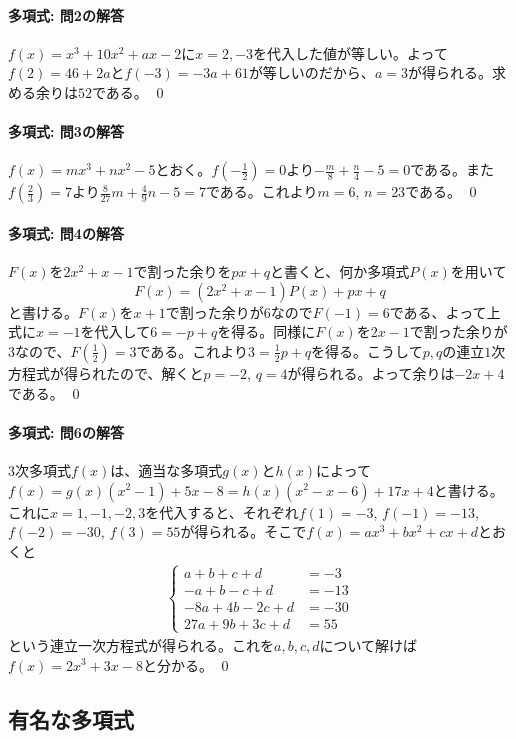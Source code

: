 \paragraph{多項式: 問2の解答}
$f(x)=x^3+10x^2+ax-2$に$x=2,-3$を代入した値が等しい。よって$f(2)=46+2a$と$f(-3)=-3a+61$が等しいのだから、$a=3$が得られる。求める余りは$52$である。 \qed

\paragraph{多項式: 問3の解答}
$f(x)=mx^3+nx^2-5$とおく。$f(-\frac{1}{2})=0$より$-\frac{m}{8}+\frac{n}{4}-5=0$である。また$f(\frac{2}{3})=7$より$\frac{8}{27}m+\frac{4}{9}n-5=7$である。これより$m=6$, $n=23$である。 \qed

\paragraph{多項式: 問4の解答} 	$F(x)$を$2x^2+x-1$で割った余りを$px+q$と書くと、何か多項式$P(x)$を用いて
\[
F(x) = (2x^2+x-1)P(x) + px + q
\]
と書ける。$F(x)$を$x+1$で割った余りが$6$なので$F(-1)=6$である、よって上式に$x=-1$を代入して$6=-p+q$を得る。同様に$F(x)$を$2x-1$で割った余りが$3$なので、$F(\frac{1}{2})=3$である。これより$3=\frac{1}{2}p+q$を得る。こうして$p,q$の連立$1$次方程式が得られたので、解くと$p=-2$, $q=4$が得られる。よって余りは$-2x+4$である。 \qed

\paragraph{多項式: 問6の解答}
$3$次多項式$f(x)$は、適当な多項式$g(x)$と$h(x)$によって$f(x)=g(x)(x^2-1)+5x-8=h(x)(x^2-x-6)+17x+4$と書ける。これに$x=1,-1,-2,3$を代入すると、それぞれ$f(1)=-3$, $f(-1)=-13$, $f(-2)=-30$, $f(3)=55$が得られる。そこで$f(x)=ax^3+bx^2+cx+d$とおくと
\begin{align*}
\begin{cases}
a+b+c+d &= -3 \\
-a+b-c+d &= -13 \\
-8a+4b-2c+d &= -30 \\
27a + 9b + 3c + d &= 55
\end{cases}
\end{align*}
という連立一次方程式が得られる。これを$a,b,c,d$について解けば$f(x) = 2x^3+3x-8$と分かる。 \qed

\subsection{有名な多項式}

